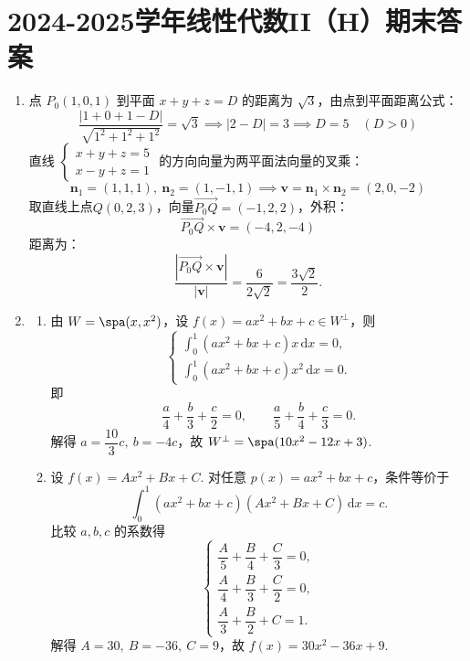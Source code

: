 \section{2024-2025学年线性代数II（H）期末答案}

\begin{enumerate}
    \item 点 $P_0(1,0,1)$ 到平面 $x+y+z=D$ 的距离为 $\sqrt{3}$，由点到平面距离公式：
    \[
    \frac{|1+0+1-D|}{\sqrt{1^2+1^2+1^2}} = \sqrt{3} \implies |2-D|=3 \implies D=5 \quad(D>0)
    \]
    直线 $\begin{cases}x+y+z=5 \\ x-y+z=1\end{cases}$ 的方向向量为两平面法向量的叉乘：
    \[
    \boldsymbol{n}_1=(1,1,1),\ \boldsymbol{n}_2=(1,-1,1) \implies \boldsymbol{v}=\boldsymbol{n}_1\times\boldsymbol{n}_2=(2,0,-2)
    \]
    取直线上点$Q(0,2,3)$，向量$\overrightarrow{P_0Q}=(-1,2,2)$，外积：
    \[ \overrightarrow{P_0Q}\times\boldsymbol{v}=(-4,2,-4) \]
    距离为：
    \[
    \frac{|\overrightarrow{P_0Q}\times\boldsymbol{v}|}{|\boldsymbol{v}|} = \frac{6}{2\sqrt{2}} = \frac{3\sqrt{2}}{2}.
    \]

    \item
    \begin{enumerate}
        \item 由 $W=\spa(x,x^2)$，设 $f(x)=ax^2+bx+c\in W^\perp$，则
        \[
            \begin{cases}
                \displaystyle \int_0^1 (ax^2+bx+c)x\,\mathrm{d}x=0,\\[0.4em]
                \displaystyle \int_0^1 (ax^2+bx+c)x^2\,\mathrm{d}x=0.
            \end{cases}
        \]
        即
        \[
            \frac{a}{4}+\frac{b}{3}+\frac{c}{2}=0,\qquad
            \frac{a}{5}+\frac{b}{4}+\frac{c}{3}=0.
        \]
        解得 $a=\dfrac{10}{3}c,\ b=-4c$，故 $W^\perp=\spa(10x^2-12x+3)$.

        \item 设 $f(x)=Ax^2+Bx+C$. 对任意 $p(x)=a x^2+b x+c$，条件等价于
        \[
            \int_0^1 (a x^2+b x+c)(Ax^2+Bx+C)\,\mathrm{d}x=c.
        \]
        比较 $a,b,c$ 的系数得
        \[
            \begin{cases}
                \dfrac{A}{5}+\dfrac{B}{4}+\dfrac{C}{3}=0,\\[0.5em]
                \dfrac{A}{4}+\dfrac{B}{3}+\dfrac{C}{2}=0,\\[0.5em]
                \dfrac{A}{3}+\dfrac{B}{2}+C=1.
            \end{cases}
        \]
        解得 $A=30,\ B=-36,\ C=9$，故 $f(x)=30x^2-36x+9$.
    \end{enumerate}


\end{enumerate}
